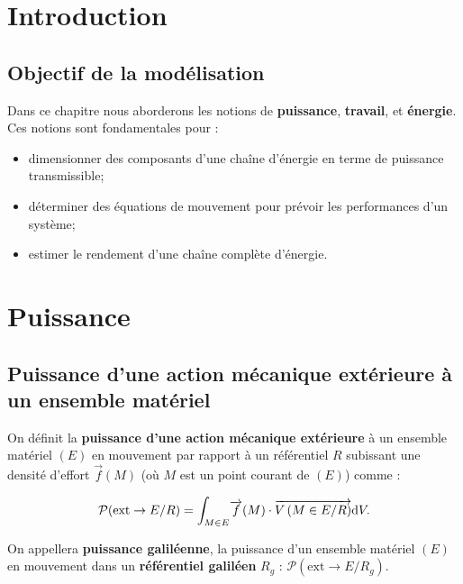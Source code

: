 \documentclass[10pt,fleqn]{article} %
\begin{document}

\setlength{\columnseprule}{.1pt}

\vspace{2cm}
\pagestyle{fancy}
\thispagestyle{plain}





\section{Introduction}
\subsection{Objectif de la modélisation}
Dans ce chapitre nous aborderons les notions de \textbf{puissance}, \textbf{travail}, et \textbf{énergie}. Ces notions sont fondamentales pour :
\begin{itemize}
\item dimensionner des composants d'une chaîne d'énergie en terme de puissance transmissible;
\item déterminer des équations de mouvement pour prévoir les performances d'un système;
\item estimer le rendement d'une chaîne complète d'énergie.
\end{itemize}



\section{Puissance}
\subsection{Puissance d'une action mécanique extérieure à un ensemble matériel}
\begin{defi}%
On définit la \textbf{puissance d'une action mécanique extérieure} à un ensemble matériel $(E)$ en mouvement par rapport à un référentiel $R$ subissant une densité d'effort $\overrightarrow{f}(M)$ (où $M$ est un point courant de $(E)$) comme :

$$
\mathcal{P}(\text{ext} \rightarrow E/R)=\displaystyle{\int_{M\in E}}\overrightarrow{f}(M)\cdot \vectv{M}{E}{R}%
\dd V.
$$
\end{defi}

\begin{rem}%
On appellera \textbf{puissance galiléenne}, la puissance d'un ensemble matériel $(E)$ en mouvement dans un \textbf{référentiel galiléen} $R_g$ : 
$
\mathcal{P}(\text{ext} \rightarrow E/R_g)
$.
\end{rem}%
\end{document}
